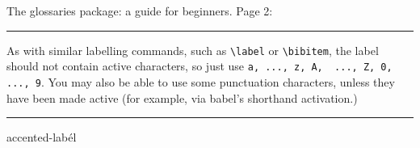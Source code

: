 \documentclass{article}
\begin{document}
The glossaries package: a guide for beginners. Page 2:

\hrule
  As  with  similar  labelling  commands,  such  as  \verb+\label+  or
  \verb+\bibitem+, the label should  not contain active characters, so
  just use  \verb+a, ..., z, A,  ..., Z, 0,  ..., 9+. You may  also be
  able to use some punctuation  characters, unless they have been made
  active (for example, via babel's shorthand activation.)
\hrule

\bigskip
\bigskip


\gls{accented-labél}%


\printglossaries
\end{document}
